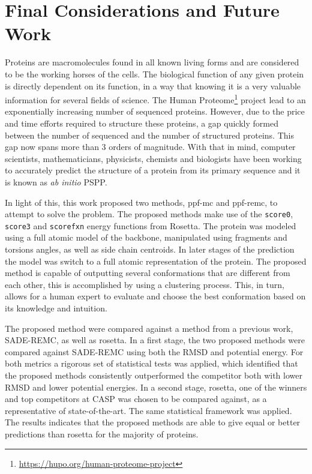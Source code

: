 \chapter{Final Considerations and Future Work}
\label{chap:final_considerations}

Proteins are macromolecules found in all known living forms and are
considered to be the working horses of the cells. The biological
function of any given protein is directly dependent on its
function, in a way that knowing it is a very valuable information
for several fields of science. The
Human Proteome\footnote{\url{https://hupo.org/human-proteome-project}} project
lead to an exponentially increasing number of sequenced proteins.
However, due to the price and time efforts required to structure
these proteins, a gap quickly formed between the number of sequenced
and the number of structured proteins. This gap now spans more than 3 orders
of magnitude. With that in mind, computer scientists, mathematicians,
physicists, chemists and biologists have been working to accurately
predict the structure of a protein from its primary
sequence and it is known as \textit{ab initio} PSPP.

In light of this, this work proposed two methods, ppf-mc and
ppf-remc, to attempt to solve the problem.
The proposed methods make use of the \texttt{score0}, \texttt{score3} and \texttt{scorefxn} energy functions
from Rosetta. The protein was modeled using a full atomic model of the backbone,
manipulated using fragments and torsions angles, as well as side chain centroids.
In later stages of the prediction the model was switch to a full atomic
representation of the protein. The proposed method is capable of outputting
several conformations that are different from each other, this is accomplished
by using a clustering process. This, in turn, allows for a human expert to
evaluate and choose the best conformation based on its knowledge and intuition.

The proposed method were compared against a method from a previous work, SADE-REMC, as
well as rosetta. In a first stage, the two proposed methods were compared
against SADE-REMC using both the RMSD and potential energy.
For both metrics a rigorous set of statistical tests was applied, which identified that
the proposed methods consistently outperformed the competitor both with lower
RMSD and lower potential energies. In a second stage, rosetta, one of the
winners and top competitors at CASP was chosen to be compared against, as a
representative of state-of-the-art. The same statistical framework was applied.
The results indicates that the proposed methods are able to give equal or better
predictions than rosetta for the majority of proteins.

